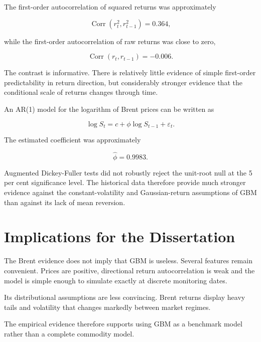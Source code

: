 \documentclass[12pt,a4paper]{report}
\begin{document}
The first-order autocorrelation of squared returns was approximately

\begin{equation}
\operatorname{Corr}
(r_t^2,r_{t-1}^2)
=
0.364,
\end{equation}

while the first-order autocorrelation of raw returns was close to zero,

\begin{equation}
\operatorname{Corr}
(r_t,r_{t-1})
=
-0.006.
\end{equation}

The contrast is informative. There is relatively little evidence of simple first-order predictability in return direction, but considerably stronger evidence that the conditional scale of returns changes through time.

An AR(1) model for the logarithm of Brent prices can be written as

\begin{equation}
\log S_t
=
c
+
\phi \log S_{t-1}
+
\varepsilon_t.
\end{equation}

The estimated coefficient was approximately

\begin{equation}
\widehat{\phi}
=
0.9983.
\end{equation}

Augmented Dickey-Fuller tests did not robustly reject the unit-root null at the 5 per cent significance level. The historical data therefore provide much stronger evidence against the constant-volatility and Gaussian-return assumptions of GBM than against its lack of mean reversion.

\section{Implications for the Dissertation}

The Brent evidence does not imply that GBM is useless. Several features remain convenient. Prices are positive, directional return autocorrelation is weak and the model is simple enough to simulate exactly at discrete monitoring dates.

Its distributional assumptions are less convincing. Brent returns display heavy tails and volatility that changes markedly between market regimes.

The empirical evidence therefore supports using GBM as a benchmark model rather than a complete commodity model.
\end{document}
